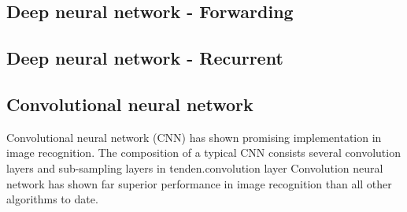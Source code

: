 \subsection{Deep neural network - Forwarding}
\subsection{Deep neural network - Recurrent}
\subsection{Convolutional neural network}
Convolutional neural network (CNN) has shown promising implementation in image recognition. The composition of a typical CNN consists several convolution layers and sub-sampling layers in tenden.convolution layer 
Convolution neural network has shown far superior performance in image recognition than all other algorithms to date.~\cite{Szegedy_2015}